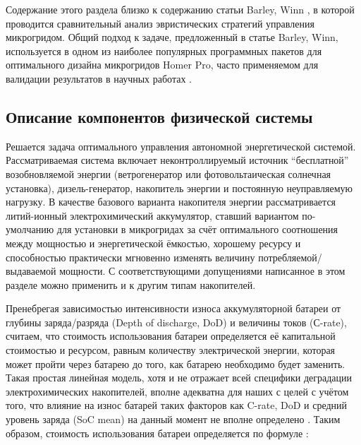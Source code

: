 Содержание этого раздела близко к содержанию статьи Barley, Winn \cite{Barley1996}, в которой проводится сравнительный анализ эвристических стратегий управления микрогридом. 
Общий подход к задаче, предложенный в статье Barley, Winn, используется в одном из наиболее популярных программных пакетов для оптимального дизайна микрогридов Homer Pro, часто применяемом для валидации результатов в научных работах \cite{Berendes2018, Aziz2019, Petersen2018, Olatomiwa2016}.

\subsection{Описание компонентов физической системы}
\label{sec:system_definition}

Решается задача оптимального управления автономной энергетической системой.\\
Рассматриваемая система включает неконтроллируемый источник ``бесплатной'' возобновляемой энергии  (ветрогенератор или фотовольтаическая солнечная установка), дизель-генератор, накопитель энергии и постоянную неуправляемую нагрузку.
В качестве базового варианта накопителя энергии рассматривается литий-ионный электрохимический аккумулятор, ставший вариантом по-умолчанию для установки в микрогридах за счёт оптимального соотношения между мощностью и энергетической ёмкостью, хорошему ресурсу и способностью практически мгновенно изменять величину потребляемой/выдаваемой мощности.
С соответствующими допущениями написанное в этом разделе можно применить и к другим типам накопителей. 

Пренебрегая зависимостью интенсивности износа аккумуляторной батареи от глубины заряда/разряда (Depth of discharge, DoD) и величины токов (С-rate), считаем, что стоимость использования батареи определяется её капитальной стоимостью и ресурсом, равным количеству электрической энергии, которая может пройти через батарею до того, как батарею необходимо будет заменить.
Такая простая линейная модель, хотя и не отражает всей специфики деградации электрохимических накопителей, вполне адекватна для наших с целей с учётом того, что влияние на износ батарей таких факторов как C-rate, DoD и средний уровень заряда (SoC mean) на данный момент не вполне определено \cite{laresgoiti2015modeling}.
Таким образом, стоимость использования батареи определяется по формуле \cite{bwc}:


